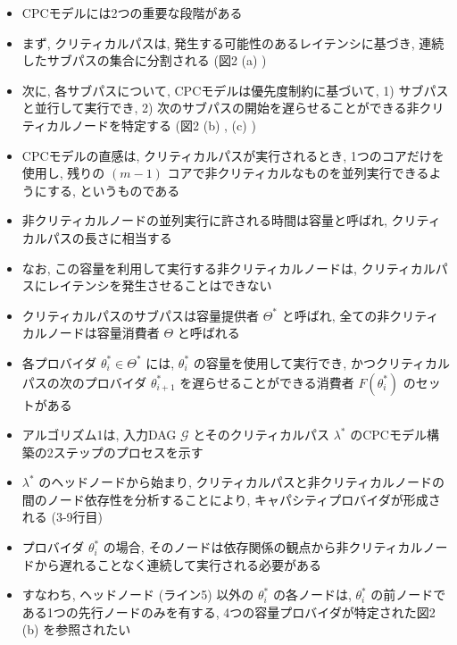 \begin{frame}{}
    \begin{itemize}
        \item CPCモデルには2つの重要な段階がある
        \item まず, クリティカルパスは, 発生する可能性のあるレイテンシに基づき, 連続したサブパスの集合に分割される (図2 (a) )
        \item 次に, 各サブパスについて, CPCモデルは優先度制約に基づいて, 1) サブパスと並行して実行でき, 2) 次のサブパスの開始を遅らせることができる非クリティカルノードを特定する (図2 (b) ,  (c) )
    \end{itemize}
\end{frame}

\begin{frame}{}
    \begin{itemize}
        \item CPCモデルの直感は, クリティカルパスが実行されるとき, 1つのコアだけを使用し, 残りの $(m-1)$ コアで非クリティカルなものを並列実行できるようにする, というものである
        \item 非クリティカルノードの並列実行に許される時間は容量と呼ばれ, クリティカルパスの長さに相当する
        \item なお, この容量を利用して実行する非クリティカルノードは, クリティカルパスにレイテンシを発生させることはできない
        \item クリティカルパスのサブパスは容量提供者 $\Theta^{*}$ と呼ばれ, 全ての非クリティカルノードは容量消費者 $\Theta$ と呼ばれる
        \item 各プロバイダ $\theta_{i}^{*} \in \Theta^{*}$ には, $\theta_{i}^{*}$ の容量を使用して実行でき, かつクリティカルパスの次のプロバイダ $\theta_{i+1}^{*}$ を遅らせることができる消費者 $F\left(\theta_{i}^{*}\right)$ のセットがある
    \end{itemize}
\end{frame}

\begin{frame}{}
    \begin{itemize}
        \item アルゴリズム1は, 入力DAG $\mathcal{G}$ とそのクリティカルパス $\lambda^{*}$ のCPCモデル構築の2ステップのプロセスを示す
        \item $\lambda^{*}$ のヘッドノードから始まり, クリティカルパスと非クリティカルノードの間のノード依存性を分析することにより, キャパシティプロバイダが形成される (3-9行目)
        \item プロバイダ $\theta_{i}^{*}$ の場合, そのノードは依存関係の観点から非クリティカルノードから遅れることなく連続して実行される必要がある
        \item すなわち, ヘッドノード (ライン5) 以外の $\theta_{i}^{*}$ の各ノードは, $\theta_{i}^{*}$ の前ノードである1つの先行ノードのみを有する, 4つの容量プロバイダが特定された図2 (b) を参照されたい
    \end{itemize}
\end{frame}


